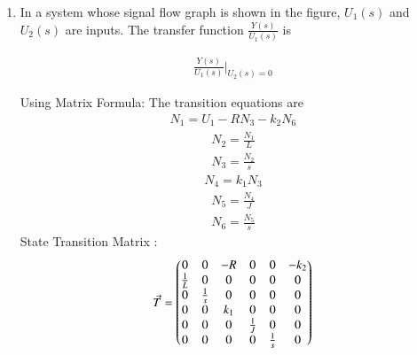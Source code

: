 \begin{enumerate}[label=\thesection.\arabic*.,ref=\thesection.\theenumi]
\item In a system whose signal flow graph is shown in the figure, $U_1(s)$ and $U_2(s)$ are inputs. The transfer function $\frac{Y(s)}{U_1(s)}$ is


\begin{figure}[!ht]
\begin{center}
		
		\resizebox{\columnwidth}{!}{}
	\end{center}
	\label{fig:ee18btech11041}
\end{figure}


\solution 
\begin{align}
    \frac{Y(s)}{U_1(s)}\Biggr|_{U_2(s)=0}
    \label{eq:ee18btech11041_1}
\end{align}

Using Matrix Formula:
\newline
The transition equations are
\begin{align}
    N_1 = U_1-RN_3-k_2N_6
    \label{eq:ee18btech11041_2}
\end{align}
\begin{align}
    N_2=\frac{N_1}{L}
    \label{eq:ee18btech11041_4}
\end{align}
\begin{align}
    N_3=\frac{N_2}{s}
    \label{eq:ee18btech11041_5}
\end{align}
\begin{align}
    N_4=k_1N_3
    \label{eq:ee18btech11041_6}
\end{align}
\begin{align}
    N_5=\frac{N_4}{J}
    \label{eq:ee18btech11041_7}
\end{align}
\begin{align}
    N_6=\frac{N_5}{s}
    \label{eq:ee18btech11041_8}
\end{align}
State Transition Matrix :
\begin{align}
    \Vec{T} = \begin{pmatrix}0 & 0 & -R & 0 & 0 & -k_2\\
    \frac{1}{L} & 0 & 0 & 0 & 0 & 0\\
    0 & \frac{1}{s} & 0 & 0 & 0 & 0\\
    0 & 0 & k_1 & 0 & 0 & 0\\
    0 & 0 & 0 & \frac{1}{J} & 0 & 0\\
    0 & 0 & 0 & 0 & \frac{1}{s} & 0\end{pmatrix}
    \label{eq:ee18btech11041_9}
\end{align}    


\end{enumerate}

